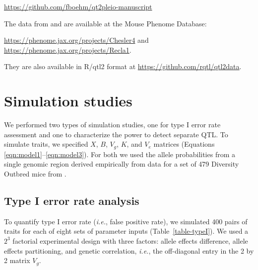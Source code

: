 \documentclass[12pt,twoside, lineno]{gsajnl}
\begin{document}
\href{https://github.com/fboehm/qtl2pleio-manuscript}{https://github.com/fboehm/qt2pleio-manuscript}

\noindent The data from \citet{recla2014precise} and
\citet{logan2013high} are available at the Mouse Phenome Database:

\href{https://phenome.jax.org/projects/Chesler4}{https://phenome.jax.org/projects/Chesler4} and \href{https://phenome.jax.org/projects/Recla1}{https://phenome.jax.org/projects/Recla1}.

\noindent They are also available in R/qtl2 format at
\href{https://github.com/rqtl/qtl2data}{https://github.com/rqtl/qtl2data}.




\section{Simulation studies}

We performed two types of simulation studies, one for type I error
rate assessment and one to characterize the power to detect separate
QTL. To simulate traits, we specified $X$, $B$, $V_g$, $K$, and $V_e$
matrices (Equations \ref{eqn:model1}--\ref{eqn:model3}). For both we
used the allele probabilities from a single genomic region derived
empirically from data for a set of 479 Diversity Outbred mice from
\citet{keller2018}.

\subsection{Type I error rate analysis}

To quantify type I error rate ({\em i.e.}, false positive rate), we
simulated 400 pairs of traits for each of eight sets of parameter
inputs (Table~\ref{table-typeI}). We used a $2^3$ factorial
experimental design with three factors: allele effects difference,
allele effects partitioning, and genetic correlation, \textit{i.e.},
the off-diagonal entry in the 2 by 2 matrix $V_g$.
\end{document}
